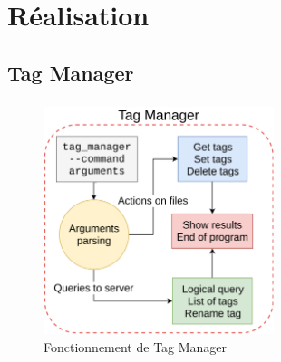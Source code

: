 \documentclass[10pt]{beamer}
\begin{document}

\section{Réalisation}
\subsection{Tag Manager}
\begin{frame}
    \frametitle{\subsecname}
    \begin{figure}
        \begin{center}
            \includegraphics[width=0.6\textwidth]{images/tag_manager2.png}
            \caption{Fonctionnement de Tag Manager}
        \end{center}
    \end{figure}
\end{frame}
\end{document}

